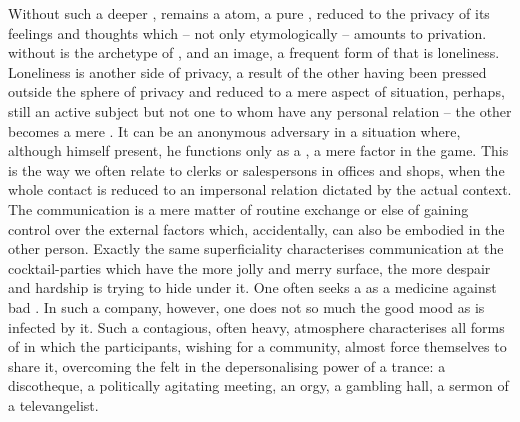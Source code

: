 Without such a deeper ,  remains a  atom,
a pure , reduced to the privacy of its  feelings and
thoughts which -- not only etymologically -- amounts to
privation.  without  is the archetype of , and an image, a frequent
 form of that is loneliness. Loneliness is another side of privacy, a
result of the other having been pressed outside the sphere of  privacy
and reduced to a mere aspect of  situation, perhaps, still an active
subject but not one to whom  have any personal relation -- the other
becomes a mere . It can be an anonymous adversary in a situation where,
although himself present, he functions only as a , a mere
factor in the  game.  This is the way we often relate to clerks or
salespersons in offices and shops, when the whole contact is reduced to an
impersonal relation dictated by the actual context. The communication is a mere
matter of routine exchange or else of gaining control over the external factors
which, accidentally, can also be embodied in the other person. Exactly the same
superficiality characterises communication at the cocktail-parties which have the
more jolly and merry surface, the more despair and hardship is trying to hide
under it. One often seeks a  as a medicine against bad
. In such a company, however, one does not so much  the good
mood as is infected by it. Such a contagious, often heavy, atmosphere
characterises all forms of  in which the participants, wishing for
a community, almost force themselves to  share it, overcoming the
felt  in the depersonalising power of a trance: a discotheque, a
politically agitating meeting, an orgy, a gambling hall, a sermon of a
televangelist.

